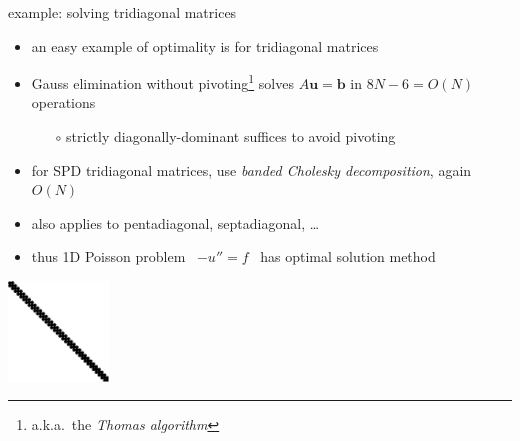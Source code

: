 \documentclass[hide notes,intlimits,usenames,dvipsnames]{beamer}
\newcommand{\bb}{\mathbf{b}}
\newcommand{\bu}{\mathbf{u}}
\begin{document}
\begin{frame}{example: solving tridiagonal matrices}
\begin{itemize}
\item an easy example of optimality is for tridiagonal matrices
\item Gauss elimination without pivoting\footnote{a.k.a.~the \emph{Thomas algorithm}} solves $A \bu = \bb$ in $8N-6=O(N)$ operations
	\begin{itemize}
	\item[$\circ$] strictly diagonally-dominant suffices to avoid pivoting
	\end{itemize}
\item for SPD tridiagonal matrices, use \emph{banded Cholesky decomposition}, again $O(N)$
\item also applies to pentadiagonal, septadiagonal, \dots
\item thus 1D Poisson problem \, $-u''=f$ \, has optimal solution method 
\end{itemize}

\bigskip
\begin{center}
\includegraphics[width=0.2\textwidth]{figs/spytri}
\end{center}
\end{frame}
\end{document}
